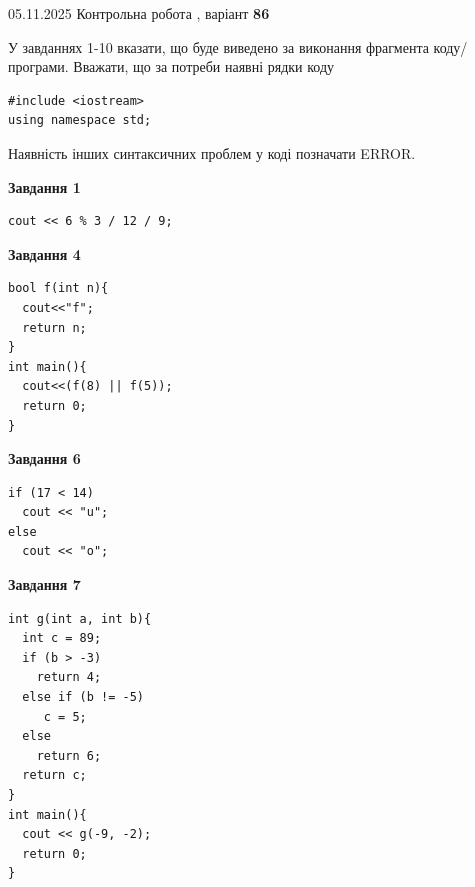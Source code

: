 \documentclass[12pt, ukrainian]{article}
\begin{document}
{\Large{05.11.2025 Контрольна робота , варіант  \No \textbf { 86 }\par}}
{
\begin {large}
У завданнях 1-10 вказати, що буде виведено за виконання фрагмента коду/про\-гра\-ми.
Вважати, що за потреби наявні рядки коду
\begin{verbatim}
#include <iostream>
using namespace std;
\end{verbatim}
Наявність інших синтаксичних проблем у коді позначати ERROR.

\begin{minipage}[t]{7.0cm}

\begin{center}
\textbf{Завдання 1}
\end{center}
\vspace{-8mm}

\begin{verbatim}
cout << 6 % 3 / 12 / 9;
\end{verbatim}



\begin{center}
\textbf{Завдання 4}
\end{center}
\vspace{-8mm}

\begin{verbatim}
bool f(int n){
  cout<<"f";
  return n;
}
int main(){
  cout<<(f(8) || f(5));
  return 0;
}
\end{verbatim}



\begin{center}
\textbf{Завдання 6}
\end{center}
\vspace{-8mm}

\begin{verbatim}
if (17 < 14)
  cout << "u";
else
  cout << "o";
\end{verbatim}



\begin{center}
\textbf{Завдання 7}
\end{center}
\vspace{-8mm}

\begin{verbatim}
int g(int a, int b){
  int c = 89;
  if (b > -3)
    return 4;
  else if (b != -5)
     c = 5;
  else
    return 6;
  return c;
}
int main(){
  cout << g(-9, -2);
  return 0;
}
\end{verbatim}


\end{minipage}
\end{large}}
\end{document}
